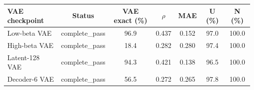 \begin{tabular}{l c c c c c c}
\toprule
VAE checkpoint & Status & VAE exact (\%) & $\rho$ & MAE & U (\%) & N (\%) \\
\midrule
Low-beta VAE & complete\_pass & 96.9 & 0.437 & 0.152 & 97.0 & 100.0 \\
High-beta VAE & complete\_pass & 18.4 & 0.282 & 0.280 & 97.4 & 100.0 \\
Latent-128 VAE & complete\_pass & 94.3 & 0.421 & 0.138 & 96.5 & 100.0 \\
Decoder-6 VAE & complete\_pass & 56.5 & 0.272 & 0.265 & 97.8 & 100.0 \\
\bottomrule
\end{tabular}
